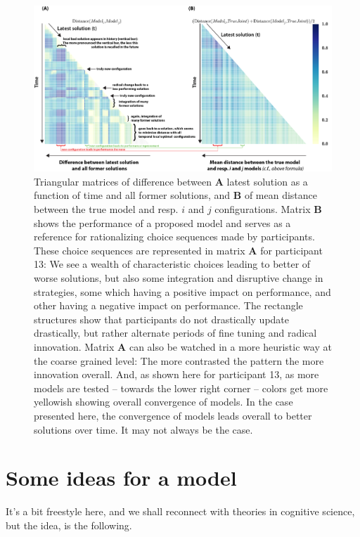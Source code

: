 \documentclass{article}
\begin{document}
\begin{figure}[h!]
\begin{center}
\includegraphics[width=0.98\columnwidth]{figures/matrice2/matrice2}
\caption{\label{fig:matrices}
Triangular matrices of difference between {\bf A} latest solution as a function of time and all former solutions, and {\bf B} of mean distance between the true model and resp. $i$ and $j$ configurations. Matrix {\bf B} shows the performance of a proposed model and serves as a reference for rationalizing choice sequences made by participants. These choice sequences are represented in matrix {\bf A} for participant 13: We see a wealth of characteristic choices leading to better of worse solutions, but also some integration and disruptive change in strategies, some which having a positive impact on performance, and other having a negative impact on performance. The rectangle structures show that participants do not drastically update drastically, but rather alternate periods of fine tuning and radical innovation. Matrix {\bf A} can also be watched in a more heuristic way at the coarse grained level: The more contrasted the pattern the more innovation overall. And, as shown here for participant 13, as more models are tested -- towards the lower right corner -- colors get more yellowish showing overall convergence of models. In the case presented here, the convergence of models leads overall to better solutions over time. It may not always be the case.%
}
\end{center}
\end{figure}

\section{Some ideas for a model}

It's a bit freestyle here, and we shall reconnect with theories in cognitive science, but the idea, is the following. 
\end{document}
